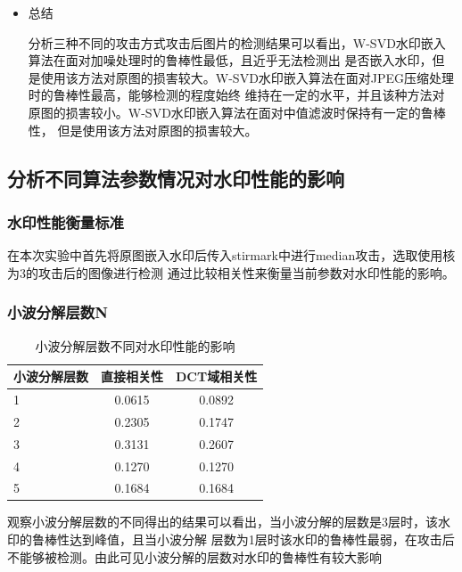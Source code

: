 \documentclass[a4paper,11pt,UTF8]{ctexart}
\begin{document}
\begin{itemize}
      \item 总结\par
        分析三种不同的攻击方式攻击后图片的检测结果可以看出，W-SVD水印嵌入算法在面对加噪处理时的鲁棒性最低，且近乎无法检测出
        是否嵌入水印，但是使用该方法对原图的损害较大。W-SVD水印嵌入算法在面对JPEG压缩处理时的鲁棒性最高，能够检测的程度始终
        维持在一定的水平，并且该种方法对原图的损害较小。W-SVD水印嵌入算法在面对中值滤波时保持有一定的鲁棒性，
        但是使用该方法对原图的损害较大。
    \end{itemize}
  \subsection{分析不同算法参数情况对水印性能的影响}
    \subsubsection{水印性能衡量标准}
      在本次实验中首先将原图嵌入水印后传入stirmark中进行median攻击，选取使用核为3的攻击后的图像进行检测
      通过比较相关性来衡量当前参数对水印性能的影响。
    \subsubsection{小波分解层数N}
      \begin{table}[H]
        \caption{小波分解层数不同对水印性能的影响}\label{tab1}
          \centering
        \begin{tabular*}{0.75\textwidth}{@{\extracolsep{\fill}}lcc}
            \toprule
            小波分解层数           &直接相关性        &DCT域相关性                         \\
            \midrule
            1                     &0.0615           &0.0892                                      \\
            2                     &0.2305           &0.1747                                      \\
            3                     &0.3131           &0.2607                                        \\
            4                     &0.1270           &0.1270                                    \\ 
            5                     &0.1684           &0.1684\\
            \bottomrule
        \end{tabular*}
      \end{table}
      观察小波分解层数的不同得出的结果可以看出，当小波分解的层数是3层时，该水印的鲁棒性达到峰值，且当小波分解
      层数为1层时该水印的鲁棒性最弱，在攻击后不能够被检测。由此可见小波分解的层数对水印的鲁棒性有较大影响
      
\end{document}
